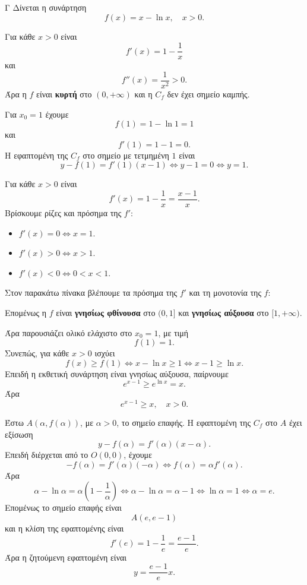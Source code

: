 \begin{thema}{Γ}
Δίνεται η συνάρτηση
\[
f(x)=x-\ln x,\quad x>0.
\]
\begin{erwthma}
\item Για κάθε $x>0$ είναι
\[
f'(x)=1-\frac{1}{x}
\]
και
\[
f''(x)=\frac{1}{x^2}>0.
\]
Άρα η $f$ είναι \textbf{κυρτή} στο $(0,+\infty)$ και η $C_f$ δεν έχει σημείο καμπής.

Για $x_0=1$ έχουμε
\[
f(1)=1-\ln1=1
\]
και
\[
f'(1)=1-1=0.
\]
Η εφαπτομένη της $C_f$ στο σημείο με τετμημένη $1$ είναι
\[
y-f(1)=f'(1)(x-1)
\Leftrightarrow y-1=0
\Leftrightarrow {y=1}.
\]

\item Για κάθε $x>0$ είναι
\[
f'(x)=1-\frac{1}{x}=\frac{x-1}{x}.
\]
Βρίσκουμε ρίζες και πρόσημα της $f'$:
\begin{itemize}
\item $f'(x)=0\Leftrightarrow x=1$.
\item $f'(x)>0\Leftrightarrow x>1$.
\item $f'(x)<0\Leftrightarrow 0<x<1$.
\end{itemize}
Στον παρακάτω πίνακα βλέπουμε τα πρόσημα της $f'$ και τη μονοτονία της $f$:
\begin{center}
\end{center}
Επομένως η $f$ είναι \textbf{γνησίως φθίνουσα} στο $(0,1]$ και \textbf{γνησίως αύξουσα} στο $[1,+\infty)$.

Άρα παρουσιάζει ολικό ελάχιστο στο $x_0=1$, με τιμή
\[
f(1)=1.
\]
Συνεπώς, για κάθε $x>0$ ισχύει
\[
f(x)\geq f(1)
\Leftrightarrow x-\ln x\geq1
\Leftrightarrow x-1\geq\ln x.
\]
Επειδή η εκθετική συνάρτηση είναι γνησίως αύξουσα, παίρνουμε
\[
e^{x-1}\geq e^{\ln x}=x.
\]
Άρα
\[
{e^{x-1}\geq x,\quad x>0}.
\]

\item Έστω $A(\alpha,f(\alpha))$, με $\alpha>0$, το σημείο επαφής. Η εφαπτομένη της $C_f$ στο $A$ έχει εξίσωση
\[
y-f(\alpha)=f'(\alpha)(x-\alpha).
\]
Επειδή διέρχεται από το $O(0,0)$, έχουμε
\[
-f(\alpha)=f'(\alpha)(-\alpha)
\Leftrightarrow f(\alpha)=\alpha f'(\alpha).
\]
Άρα
\[
\alpha-\ln\alpha=\alpha\left(1-\frac{1}{\alpha}\right)
\Leftrightarrow \alpha-\ln\alpha=\alpha-1
\Leftrightarrow \ln\alpha=1
\Leftrightarrow \alpha=e.
\]
Επομένως το σημείο επαφής είναι
\[
A(e,e-1)
\]
και η κλίση της εφαπτομένης είναι
\[
f'(e)=1-\frac{1}{e}=\frac{e-1}{e}.
\]
Άρα η ζητούμενη εφαπτομένη είναι
\[
{y=\frac{e-1}{e}x}.
\]


\end{erwthma}
\end{thema}
